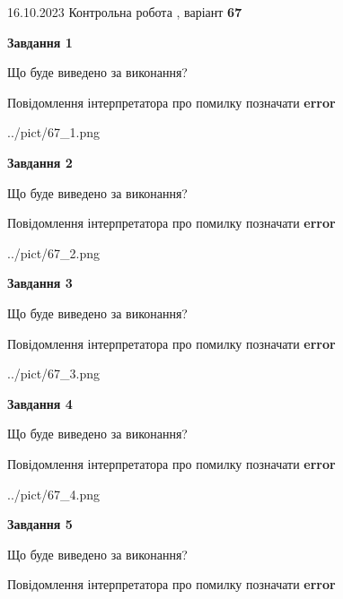 \documentclass[12pt, ukrainian]{article}
\begin{document}
{\Large{16.10.2023 Контрольна робота , варіант  \No \textbf { 67 }\par}}
{
\begin {large}
{\begin {center}\textbf{Завдання 1}\end {center}}\par
Що буде виведено за виконання? \par
Повідомлення інтерпретатора про помилку позначати \textbf{error}

\begin{center}
	{../pict/67_1.png}
\end{center}
\newpage

{\begin {center}\textbf{Завдання 2}\end {center}}\par
Що буде виведено за виконання? \par
Повідомлення інтерпретатора про помилку позначати \textbf{error}

\begin{center}
	{../pict/67_2.png}
\end{center}
\newpage

{\begin {center}\textbf{Завдання 3}\end {center}}\par
Що буде виведено за виконання? \par
Повідомлення інтерпретатора про помилку позначати \textbf{error}

\begin{center}
	{../pict/67_3.png}
\end{center}
\newpage

{\begin {center}\textbf{Завдання 4}\end {center}}\par
Що буде виведено за виконання? \par
Повідомлення інтерпретатора про помилку позначати \textbf{error}

\begin{center}
	{../pict/67_4.png}
\end{center}
\newpage

{\begin {center}\textbf{Завдання 5}\end {center}}\par
Що буде виведено за виконання? \par
Повідомлення інтерпретатора про помилку позначати \textbf{error}


\end{large}}
\end{document}
